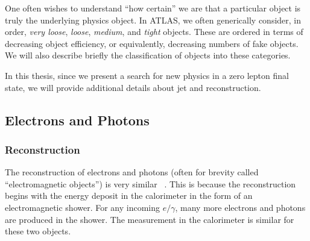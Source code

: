 One often wishes to understand ``how certain'' we are that a particular object is truly the underlying physics object.
In ATLAS, we often generically consider, in order, \textit{very loose}, \textit{loose}, \textit{medium}, and \textit{tight} objects\footnotemark.
These are ordered in terms of decreasing object efficiency, or equivalently, decreasing numbers of fake objects.
We will also describe briefly the classification of objects into these categories.

In this thesis, since we present a search for new physics in a zero lepton final state, we will provide additional details about jet and \met reconstruction.


\subsection{Electrons and Photons}

\subsubsection{Reconstruction}
The reconstruction of electrons and photons (often for brevity called ``electromagnetic objects'') is very similar ~\cite{Aaboud:2016yuq,PERF-2013-05,PERF-2013-03}.
This is because the reconstruction begins with the energy deposit in the calorimeter in the form of an electromagnetic shower.
For any incoming $e/\gamma$, many more electrons and photons are produced in the shower.
The measurement in the calorimeter is similar for these two objects.

